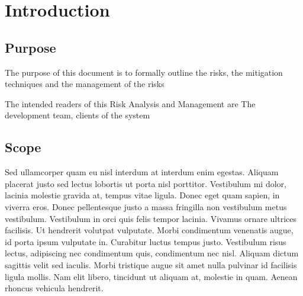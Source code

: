 
\chapter{Introduction} %

\label{Part4Chapter1} %




\section{Purpose}

The purpose of this document is to formally outline the risks, the mitigation techniques and the management of the risks 

The intended readers of this Risk Analysis and Management are The development team, clients of the system

\section{Scope}

Sed ullamcorper quam eu nisl interdum at interdum enim egestas. Aliquam placerat justo sed lectus lobortis ut porta nisl porttitor. Vestibulum mi dolor, lacinia molestie gravida at, tempus vitae ligula. Donec eget quam sapien, in viverra eros. Donec pellentesque justo a massa fringilla non vestibulum metus vestibulum. Vestibulum in orci quis felis tempor lacinia. Vivamus ornare ultrices facilisis. Ut hendrerit volutpat vulputate. Morbi condimentum venenatis augue, id porta ipsum vulputate in. Curabitur luctus tempus justo. Vestibulum risus lectus, adipiscing nec condimentum quis, condimentum nec nisl. Aliquam dictum sagittis velit sed iaculis. Morbi tristique augue sit amet nulla pulvinar id facilisis ligula mollis. Nam elit libero, tincidunt ut aliquam at, molestie in quam. Aenean rhoncus vehicula hendrerit.

